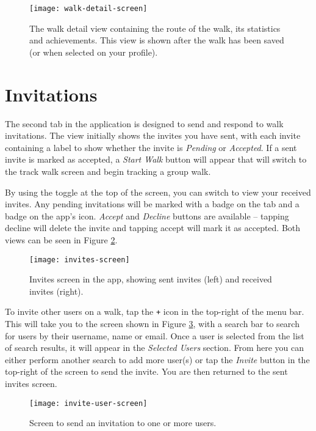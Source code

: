\begin{figure}[hbt]
  \centering
  \texttt{[image: walk-detail-screen]}
  \caption{The walk detail view containing the route of the walk, its statistics and achievements. This view is shown after the walk has been saved (or when selected on your profile).}
  \label{fig:walk-detail-screen}
\end{figure}


\section{Invitations}

The second tab in the application is designed to send and respond to walk invitations. The view initially shows the invites you have sent, with each invite containing a label to show whether the invite is \textit{Pending} or \textit{Accepted}. If a sent invite is marked as accepted, a \textit{Start Walk} button will appear that will switch to the track walk screen and begin tracking a group walk.

By using the toggle at the top of the screen, you can switch to view your received invites. Any pending invitations will be marked with a badge on the tab and a badge on the app's icon. \textit{Accept} and \textit{Decline} buttons are available -- tapping decline will delete the invite and tapping accept will mark it as accepted. Both views can be seen in Figure \ref{fig:invites-screen}.

\begin{figure}[hbt]
  \centering
  \texttt{[image: invites-screen]}
  \caption{Invites screen in the app, showing sent invites (left) and received invites (right).}
  \label{fig:invites-screen}
\end{figure}

To invite other users on a walk, tap the \texttt{+} icon in the top-right of the menu bar. This will take you to the screen shown in Figure \ref{fig:invite-user-screen}, with a search bar to search for users by their username, name or email. Once a user is selected from the list of search results, it will appear in the \textit{Selected Users} section. From here you can either perform another search to add more user(s) or tap the \textit{Invite} button in the top-right of the screen to send the invite. You are then returned to the sent invites screen.

\begin{figure}[hbt]
  \centering
  \texttt{[image: invite-user-screen]}
  \caption{Screen to send an invitation to one or more users.}
  \label{fig:invite-user-screen}
\end{figure}



